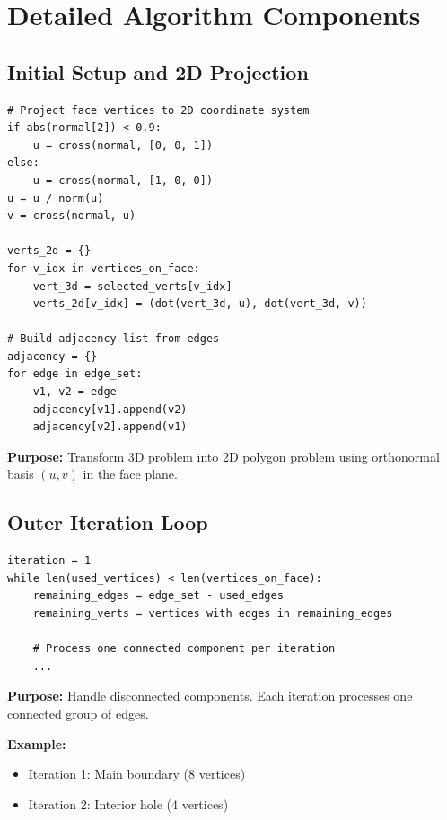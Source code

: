 \documentclass[11pt]{article}
\begin{document}
\section{Detailed Algorithm Components}

\subsection{Initial Setup and 2D Projection}

\begin{lstlisting}[caption={Initialization and projection},label={lst:init}]
# Project face vertices to 2D coordinate system
if abs(normal[2]) < 0.9:
    u = cross(normal, [0, 0, 1])
else:
    u = cross(normal, [1, 0, 0])
u = u / norm(u)
v = cross(normal, u)

verts_2d = {}
for v_idx in vertices_on_face:
    vert_3d = selected_verts[v_idx]
    verts_2d[v_idx] = (dot(vert_3d, u), dot(vert_3d, v))

# Build adjacency list from edges
adjacency = {}
for edge in edge_set:
    v1, v2 = edge
    adjacency[v1].append(v2)
    adjacency[v2].append(v1)
\end{lstlisting}

\textbf{Purpose:} Transform 3D problem into 2D polygon problem using orthonormal basis $(u, v)$ in the face plane.

\subsection{Outer Iteration Loop}

\begin{lstlisting}[caption={Multi-iteration structure for disconnected components},label={lst:outerloop}]
iteration = 1
while len(used_vertices) < len(vertices_on_face):
    remaining_edges = edge_set - used_edges
    remaining_verts = vertices with edges in remaining_edges
    
    # Process one connected component per iteration
    ...
\end{lstlisting}

\textbf{Purpose:} Handle disconnected components. Each iteration processes one connected group of edges.

\textbf{Example:}
\begin{itemize}
    \item Iteration 1: Main boundary (8 vertices)
    \item Iteration 2: Interior hole (4 vertices)
\end{itemize}
\end{document}
